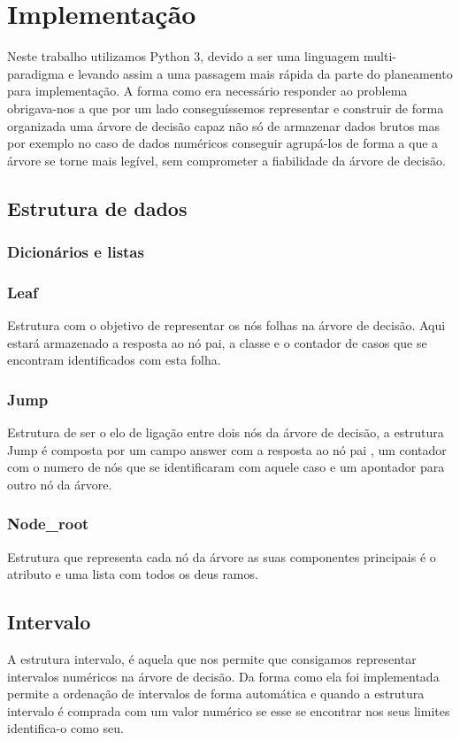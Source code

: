 \documentclass[12pt,a4paper]{article}
\begin{document}
\section{Implementação}
Neste trabalho utilizamos Python 3, devido a ser uma linguagem multi-paradigma e levando assim a uma passagem mais rápida da parte do planeamento para implementação.
A forma como era necessário responder ao problema obrigava-nos a que por um lado conseguíssemos representar e construir de forma organizada uma árvore de decisão capaz não só de armazenar dados brutos mas por exemplo no caso de dados numéricos conseguir agrupá-los de forma a que a árvore se torne mais legível, sem comprometer a fiabilidade da árvore de decisão.  
\subsection{Estrutura de dados}

\subsubsection{Dicionários e listas}


\subsubsection{Leaf}
Estrutura com o objetivo de representar os nós folhas na árvore de decisão. Aqui estará armazenado a resposta ao nó pai, a classe e o contador de casos que se encontram identificados com esta folha.

\subsubsection{Jump}
Estrutura de ser o elo de ligação entre dois nós da árvore  de decisão, a estrutura Jump é composta por um campo answer com a resposta ao nó pai , um contador com o numero de nós que se identificaram com aquele caso e um apontador para outro nó da árvore.

\subsubsection{Node\_root}
Estrutura que representa cada nó da árvore as suas componentes principais é o atributo e uma lista com todos os deus ramos.


\subsection{Intervalo}
A estrutura intervalo, é aquela que nos permite que consigamos representar intervalos numéricos na árvore de decisão. Da forma como ela foi implementada permite a ordenação de intervalos de forma automática e quando a estrutura intervalo é comprada com um valor numérico se esse se encontrar nos seus limites identifica-o como seu.
\end{document}
